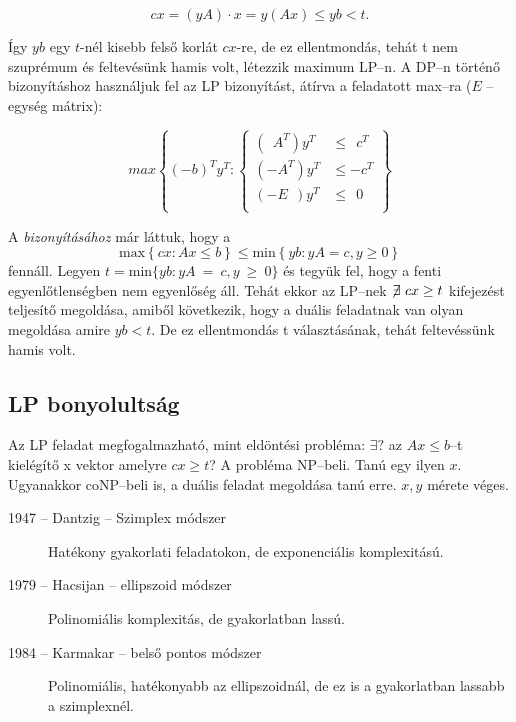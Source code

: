 \[ cx = (yA)\cdot x = y (Ax) \leq yb < t.\]

Így $yb$ egy $t$-nél kisebb felső korlát $cx$-re, de ez ellentmondás, tehát t
nem szuprémum és feltevésünk hamis volt, létezzik maximum LP--n. A DP--n történő
bizonyításhoz használjuk fel az LP bizonyítást, átírva a feladatott max--ra ($E$
-- egység mátrix):

\[ max \left\{ (-b)^T y^T :
\begin{cases}
(~~A^T)y^T    &\leq~~c^T \\
(-A^T) y^T &\leq -c^T \\
(-E~~)y^T    &\leq~~0 \\
\end{cases}  \right\} \]
 
A  \emph{bizonyításához} már láttuk, hogy a \[ \mbox{max}\left\{
cx:Ax \leq b \right\} \leq
   \mbox{min}\left\{ yb:yA = c, y \geq 0 \right\}
\] fennáll. Legyen $t=\mbox{min}\{ yb:yA~=~c, y~\geq~0 \}$ és tegyük fel, hogy a
fenti egyenlőtlenségben nem egyenlőség áll.  Tehát ekkor az LP--nek
$\not\!\exists~cx \geq t$ kifejezést teljesítő megoldása, amiből következik,
hogy a duális feladatnak van olyan megoldása amire $yb<t$. De ez ellentmondás t
választásának, tehát feltevéssünk hamis volt.

\subsection{LP bonyolultság}

Az LP feladat megfogalmazható, mint eldöntési probléma: $\exists?$ az $Ax \leq
b$--t kielégítő x vektor amelyre $cx\geq t$? A probléma NP--beli. Tanú egy ilyen
$x$. Ugyanakkor coNP--beli is, a duális feladat megoldása tanú erre. $x, y$
mérete véges.

\begin{description}
  \item[1947 -- Dantzig -- Szimplex módszer] Hatékony gyakorlati feladatokon, de
  exponenciális komplexitású.
  \item[1979 --  Hacsijan -- ellipszoid módszer] Polinomiális komplexitás, de
  gyakorlatban lassú.
  \item[1984 --  Karmakar -- belső pontos módszer]  Polinomiális, hatékonyabb az
  ellipszoidnál, de ez is a gyakorlatban lassabb a szimplexnél.
\end{description}